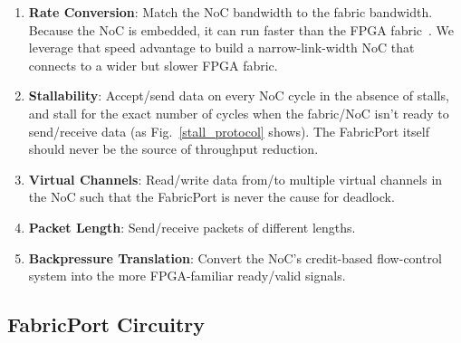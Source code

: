 \vspace{-0.1cm}

\begin{enumerate}
\setlength\itemsep{-0.33mm}
\item \textbf{Rate Conversion}: Match the NoC bandwidth to the fabric bandwidth. Because the NoC is embedded, it can run \xx faster than the FPGA fabric~\cite{fpt,trets}. We leverage that speed advantage to build a narrow-link-width NoC that connects to a wider but slower FPGA fabric. 
\item \textbf{Stallability}: Accept/send data on every NoC cycle in the absence of stalls, and stall for the exact number of cycles when the fabric/NoC isn't ready to send/receive data (as Fig.~\ref{stall_protocol} shows). The FabricPort itself should never be the source of throughput reduction.
\item \textbf{Virtual Channels}: Read/write data from/to multiple virtual channels in the NoC such that the FabricPort is never the cause for deadlock.
\item \textbf{Packet Length}: Send/receive packets of different lengths.
\item \textbf{Backpressure Translation}: Convert the NoC's credit-based flow-control system into the more FPGA-familiar ready/valid signals.
\end{enumerate}

\vspace{-0.25cm}

%
%

\subsection{FabricPort Circuitry}


